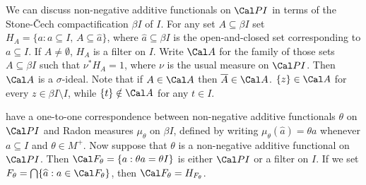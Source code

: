  We can
discuss non-negative additive functionals on $\Cal PI$ in terms of the
Stone-\v Cech compactification $\beta I$ of $I$.
For any set $A\subseteq\beta I$ set
$H_A=\{a:a\subseteq I,\,A\subseteq\widehat{a}\}$, where
$\widehat{a}\subseteq\beta I$ is the
open-and-closed set corresponding to $a\subseteq I$.   If
$A\ne\emptyset$, $H_A$ is a filter on $I$.   Write $\Cal A$ for the
family of those sets $A\subseteq\beta I$ such that $\nu^*H_A=1$,
where $\nu$ is the usual measure on $\Cal PI$.   Then $\Cal A$ is a
$\sigma$-ideal.
   Note
that if $A\in\Cal A$ then $\overline{A}\in\Cal A$.    $\{z\}\in\Cal A$
for every $z\in\beta I\setminus I$, while $\{t\}\notin\Cal A$ for
any $t\in I$.

have a one-to-one correspondence between non-negative additive
functionals $\theta$ on $\Cal PI$ and Radon measures $\mu_{\theta}$ on
$\beta I$, defined by
writing $\mu_{\theta}(\widehat{a})=\theta a$ whenever $a\subseteq I$ and
$\theta\in M^+$.
Now suppose that $\theta$ is a non-negative additive functional on
$\Cal PI$.   Then $\Cal F_{\theta}=\{a:\theta a=\theta I\}$ is either
$\Cal PI$ or a filter on $I$.   If we set
$F_{\theta}=\bigcap\{\widehat{a}:a\in\Cal F_{\theta}\}$, then
$\Cal F_{\theta}=H_{F_{\theta}}$.

